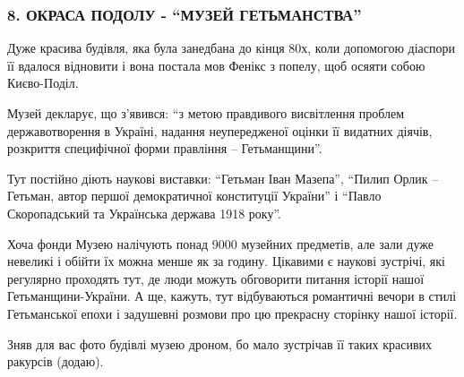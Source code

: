  
 
 
 
 
\subsubsection{8. ОКРАСА ПОДОЛУ - \enquote{МУЗЕЙ ГЕТЬМАНСТВА}}
\label{sec:28_01_2022.fb.fb_group.story_kiev_ua.1.kiev_visim_sekretiv.8.muzej_getmanstva}

Дуже красива будівля, яка була занедбана до кінця 80х, коли допомогою діаспори
її вдалося відновити і вона постала мов Фенікс з попелу, щоб осяяти собою
Києво-Поділ.


Музей декларує, що з’явився: \enquote{з метою правдивого висвітлення проблем
державотворення в Україні, надання неупередженої оцінки її видатних діячів,
розкриття специфічної форми правління – Гетьманщини}.


Тут постійно діють наукові виставки: \enquote{Гетьман Іван Мазепа},
\enquote{Пилип Орлик – Гетьман, автор першої демократичної конституції України}
і \enquote{Павло Скоропадський та Українська держава 1918 року}. 


Хоча фонди Музею налічують понад 9000 музейних предметів, але зали дуже
невеликі і обійти їх можна менше як за годину. Цікавими є наукові зустрічі, які
регулярно проходять тут, де люди можуть обговорити питання історії нашої
Гетьманщини-України. А ще, кажуть, тут відбуваються романтичні вечори в стилі
Гетьманської епохи і задушевні розмови про цю прекрасну сторінку нашої історії.


Зняв для вас фото будівлі музею дроном, бо мало зустрічав її таких красивих
ракурсів (додаю). 

